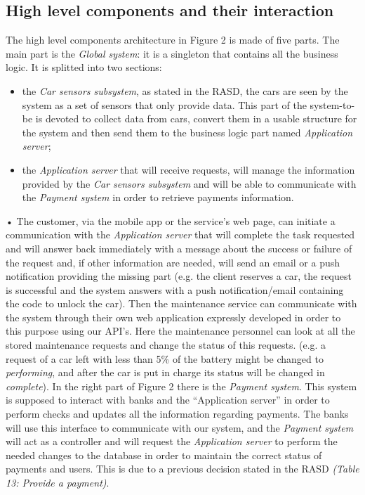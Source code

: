 \documentclass[10pt, a4paper,titlepage]{article}
\begin{document}
\subsection{High level components and their interaction}
The high level components architecture in Figure 2 is made of five parts. The main part is the \emph{Global system}: it is a singleton that contains all the business logic. It is splitted into two sections: 
\begin{itemize}
\item the \emph{Car sensors subsystem}, as stated in the RASD, the cars are seen by the system as a set of sensors that only provide data. This part of the system-to-be is devoted to collect data from cars, convert them in a usable structure for the system and then send them to the business logic part named \emph{Application server};
\item the \emph{Application server} that will receive requests, will manage the information provided by the \emph{Car sensors subsystem} and will be able to communicate with the \emph{Payment system} in order to retrieve payments information.
\end{itemize}•
The customer, via the mobile app or the service’s web page, can initiate a communication with the \emph{Application server} that will complete the task requested and will answer back immediately with a message about the success or failure of the request and, if other information are needed, will send an email or a push notification providing the missing part (e.g. the client reserves a car, the request is successful and the system answers with a push notification/email containing the code to unlock the car).
Then the maintenance service can communicate with the system through their own web application expressly developed in order to this purpose using our API's. Here the maintenance personnel can look at all the stored maintenance requests and change the status of this requests. (e.g. a request of a car left with less than 5\% of the battery might be changed to \textit{performing}, and after the car is put in charge its status will be changed in \textit{complete}).
In the right part of Figure 2 there is the \emph{Payment system}. This system is supposed to interact with banks and the “Application server” in order to perform checks and updates all the information regarding payments. The banks will use this interface to communicate with our system, and the \emph{Payment system} will act as a controller and will request the \emph{Application server} to perform the needed changes to the database in order to maintain the correct status of payments and users. This is due to a previous decision stated in the RASD \textit{(Table 13: Provide a payment)}.
\end{document}

